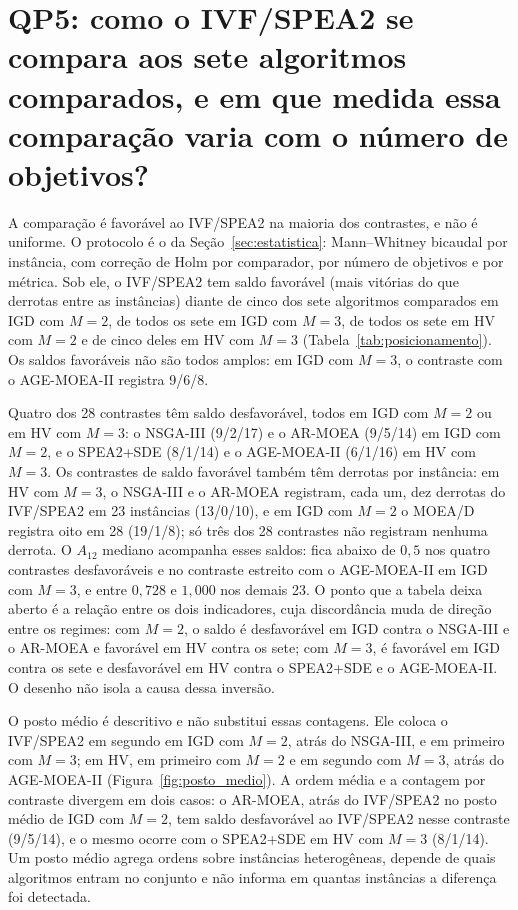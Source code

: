 \section{QP5: como o IVF/SPEA2 se compara aos sete algoritmos comparados, e em que medida essa comparação varia com o número de objetivos?}
\label{sec:resposta_qp5}

A comparação é favorável ao IVF/SPEA2 na maioria dos contrastes, e não é uniforme. O protocolo é o da Seção~\ref{sec:estatistica}: Mann--Whitney bicaudal por instância, com correção de Holm por comparador, por número de objetivos e por métrica. Sob ele, o IVF/SPEA2 tem saldo favorável (mais vitórias do que derrotas entre as instâncias) diante de cinco dos sete algoritmos comparados em IGD com $M = 2$, de todos os sete em IGD com $M = 3$, de todos os sete em HV com $M = 2$ e de cinco deles em HV com $M = 3$ (Tabela~\ref{tab:posicionamento}). Os saldos favoráveis não são todos amplos: em IGD com $M = 3$, o contraste com o AGE-MOEA-II registra 9/6/8.

Quatro dos 28 contrastes têm saldo desfavorável, todos em IGD com $M = 2$ ou em HV com $M = 3$: o NSGA-III (9/2/17) e o AR-MOEA (9/5/14) em IGD com $M = 2$, e o SPEA2+SDE (8/1/14) e o AGE-MOEA-II (6/1/16) em HV com $M = 3$. Os contrastes de saldo favorável também têm derrotas por instância: em HV com $M = 3$, o NSGA-III e o AR-MOEA registram, cada um, dez derrotas do IVF/SPEA2 em 23 instâncias (13/0/10), e em IGD com $M = 2$ o MOEA/D registra oito em 28 (19/1/8); só três dos 28 contrastes não registram nenhuma derrota. O $A_{12}$ mediano acompanha esses saldos: fica abaixo de $0{,}5$ nos quatro contrastes desfavoráveis e no contraste estreito com o AGE-MOEA-II em IGD com $M = 3$, e entre $0{,}728$ e $1{,}000$ nos demais 23. O ponto que a tabela deixa aberto é a relação entre os dois indicadores, cuja discordância muda de direção entre os regimes: com $M = 2$, o saldo é desfavorável em IGD contra o NSGA-III e o AR-MOEA e favorável em HV contra os sete; com $M = 3$, é favorável em IGD contra os sete e desfavorável em HV contra o SPEA2+SDE e o AGE-MOEA-II. O desenho não isola a causa dessa inversão.

O posto médio é descritivo e não substitui essas contagens. Ele coloca o IVF/SPEA2 em segundo em IGD com $M = 2$, atrás do NSGA-III, e em primeiro com $M = 3$; em HV, em primeiro com $M = 2$ e em segundo com $M = 3$, atrás do AGE-MOEA-II (Figura~\ref{fig:posto_medio}). A ordem média e a contagem por contraste divergem em dois casos: o AR-MOEA, atrás do IVF/SPEA2 no posto médio de IGD com $M = 2$, tem saldo desfavorável ao IVF/SPEA2 nesse contraste (9/5/14), e o mesmo ocorre com o SPEA2+SDE em HV com $M = 3$ (8/1/14). Um posto médio agrega ordens sobre instâncias heterogêneas, depende de quais algoritmos entram no conjunto e não informa em quantas instâncias a diferença foi detectada.

